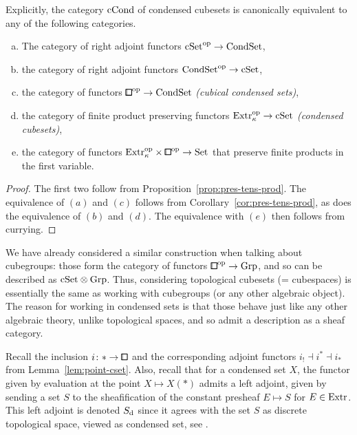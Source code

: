 \begin{proposition}\label{prop:cond-cube-descr}
Explicitly, the category $\mathrm{cCond}$ of condensed cubesets is canonically equivalent to any of the following categories.
\begin{enumerate}[(a)]
    \item The category of right adjoint functors $\mathrm{cSet}^{\mathrm{op}}\to\mathrm{CondSet}$,
    \item the category of right adjoint functors $\mathrm{CondSet}^{\mathrm{op}}\to\mathrm{cSet}$,
    \item the category of functors ${\bbox}^\op\to\CondSet$ \emph{(cubical condensed sets)},
    \item the category of finite product preserving functors $\mathrm{Extr}_\kappa^{\mathrm{op}}\to\mathrm{cSet}$ \emph{(condensed cubesets)},
    \item the category of functors $\extr_\kappa^\op\times{\bbox}^\op\to\set$ that preserve finite products in the first variable.
\end{enumerate}
\end{proposition}

\begin{proof}
The first two follow from Proposition~\ref{prop:pres-tens-prod}.
The equivalence of $(a)$ and $(c)$ follows from Corollary~\ref{cor:pres-tens-prod}, as does the equivalence of $(b)$ and $(d)$.
The equivalence with $(e)$ then follows from currying.
\end{proof}

\begin{remark}
We have already considered a similar construction when talking about cubegroups:
those form the category of functors ${\bbox}^\op\to\Grp$, and so can be described as $\mathrm{cSet}\otimes\mathrm{Grp}$.
Thus, considering topological cubesets (= cubespaces) is essentially the same as working with cubegroups (or any other algebraic object).
The reason for working in condensed sets is that those behave just like any other algebraic theory,
unlike topological spaces, and so admit a description as a sheaf category.
\end{remark}

Recall the inclusion $i\colon\ast\to\bbox$ and the corresponding adjoint functors
$i_!\dashv i^\ast\dashv i_\ast$ from Lemma~\ref{lem:point-cset}.
Also, recall that for a condensed set $X$, the functor given by evaluation at the point $X\mapsto X(\ast)$
admits a left adjoint, given by sending a set $S$ to the sheafification of the constant presheaf
$E\mapsto S$ for $E\in\mathrm{Extr}$.
This left adjoint is denoted $S_{\mathrm{d}}$ since it agrees with the set $S$
as discrete topological space, viewed as condensed set, see \cite[Lemma 2.4.38]{Bihlmaier2025}.

